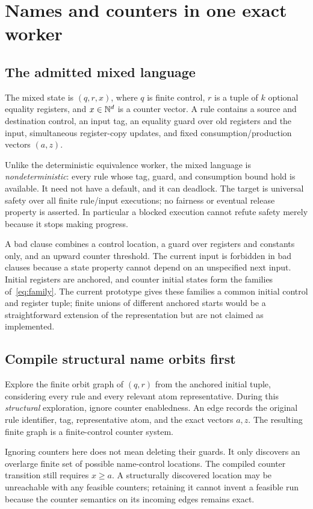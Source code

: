 \section{Names and counters in one exact worker}
\label{sec:product}

\subsection{The admitted mixed language}
The mixed state is $(q,r,x)$, where $q$ is finite control, $r$ is a tuple of $k$
optional equality registers, and $x\in\mathbb N^d$ is a counter vector. A rule contains
a source and destination control, an input tag, an equality guard over old
registers and the input, simultaneous register-copy updates, and fixed
consumption/production vectors $(a,z)$.

Unlike the deterministic equivalence worker, the mixed language is
\emph{nondeterministic}: every rule whose tag, guard, and consumption bound hold
is available. It need not have a default, and it can deadlock. The target is
universal safety over all finite rule/input executions; no fairness or eventual
release property is asserted. In particular a blocked execution cannot refute
safety merely because it stops making progress.

A bad clause combines a control location, a guard over registers and constants
only, and an upward counter threshold. The current input is forbidden in bad
clauses because a state property cannot depend on an unspecified next input.
Initial registers are anchored, and counter initial states form the families
of~\eqref{eq:family}. The current prototype gives these families a common
initial control and register tuple; finite unions of different anchored starts
would be a straightforward extension of the representation but are not claimed
as implemented.

\subsection{Compile structural name orbits first}
Explore the finite orbit graph of $(q,r)$ from the anchored initial tuple,
considering every rule and every relevant atom representative. During this
\emph{structural} exploration, ignore counter enabledness. An edge records the
original rule identifier, tag, representative atom, and the exact vectors
$a,z$. The resulting finite graph is a finite-control counter system.

Ignoring counters here does not mean deleting their guards. It only discovers
an overlarge finite set of possible name-control locations. The compiled
counter transition still requires $x\ge a$. A structurally discovered location
may be unreachable with any feasible counters; retaining it cannot invent a
feasible run because the counter semantics on its incoming edges remains exact.

